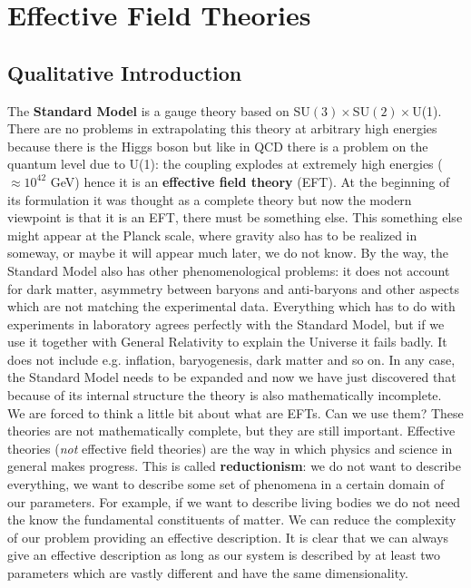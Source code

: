 \documentclass[../main.tex]{subfiles}
\begin{document}
\setchapterpreamble[u]{\margintoc}
\chapter[Effective Field Theories]{Effective Field Theories\footnotemark[0]}
\section{Qualitative Introduction}
The \textbf{Standard Model} is a gauge theory based on SU$(3)\times$SU$(2)\times$U(1). There are no problems in extrapolating this theory at arbitrary high energies because there is the Higgs boson but like in QCD there is a problem on the quantum level due to U(1): the coupling explodes at extremely high energies ($\approx10^{42}$ GeV) hence it is an \textbf{effective field theory} (EFT). At the beginning of its formulation it was thought as a complete theory but now the modern viewpoint is that it is an EFT, there must be something else. This something else might appear at the Planck scale, where gravity also has to be realized in someway, or maybe it will appear much later, we do not know. By the way, the Standard Model also has other phenomenological problems: it does not account for dark matter, asymmetry between baryons and anti-baryons and other aspects which are not matching the experimental data. Everything which has to do with experiments in laboratory agrees perfectly with the Standard Model, but if we use it together with General Relativity to explain the Universe it fails badly. It does not include e.g. inflation, baryogenesis, dark matter and so on. In any case, the Standard Model needs to be expanded and now we have just discovered that because of its internal structure the theory is also mathematically incomplete.\\ 
We are forced to think a little bit about what are EFTs. Can we use them? These theories are not mathematically complete, but they are still important. Effective theories (\textit{not} effective field theories) are the way in which physics and science in general makes progress. This is called \textbf{reductionism}: we do not want to describe everything, we want to describe some set of phenomena in a certain domain of our parameters. For example, if we want to describe living bodies we do not need the know the fundamental constituents of matter. We can reduce the complexity of our problem providing an effective description. It is clear that we can always give an effective description as long as our system is described by at least two parameters which are vastly different and have the same dimensionality. 
\end{document}
